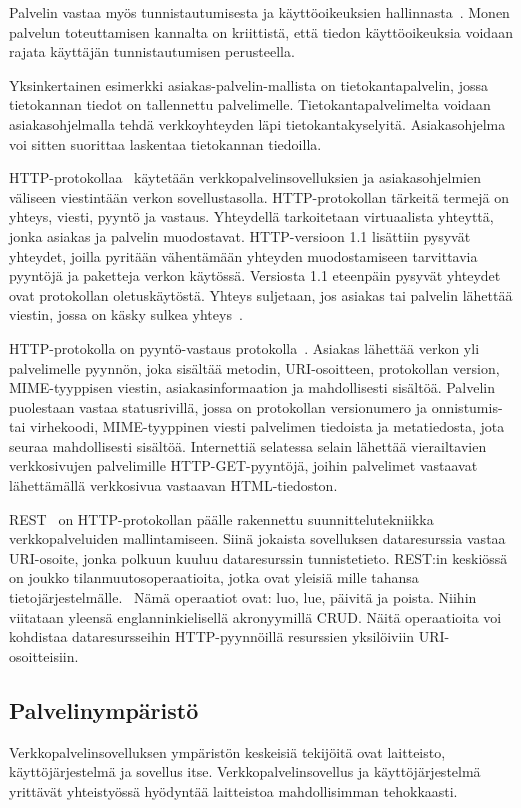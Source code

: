 \documentclass[finnish]{tktltiki2}%
\theoremstyle{definition}
\theoremstyle{remark}
\begin{document}
Palvelin vastaa myös tunnistautumisesta ja käyttöoikeuksien hallinnasta~\cite{pai_flash_1999}.
Monen palvelun toteuttamisen kannalta on kriittistä, että
tiedon käyttöoikeuksia voidaan rajata käyttäjän tunnistautumisen perusteella.

Yksinkertainen esimerkki asiakas-palvelin-mallista on tietokantapalvelin,
jossa tietokannan tiedot on tallennettu palvelimelle. Tietokantapalvelimelta
voidaan asiakasohjelmalla tehdä verkkoyhteyden läpi tietokantakyselyitä. Asiakasohjelma
voi sitten suorittaa laskentaa tietokannan tiedoilla.

HTTP-protokollaa~\cite{leach_hypertext} käytetään verkkopalvelinsovelluksien ja
asiakasohjelmien väliseen viestintään verkon sovellustasolla.
HTTP-protokollan tärkeitä termejä on yhteys, viesti, pyyntö ja vastaus.
Yhteydellä tarkoitetaan virtuaalista yhteyttä, jonka asiakas ja palvelin muodostavat.
HTTP-versioon 1.1 lisättiin pysyvät yhteydet, joilla pyritään
vähentämään yhteyden muodostamiseen tarvittavia pyyntöjä ja paketteja verkon
käytössä. Versiosta 1.1 eteenpäin pysyvät yhteydet ovat protokollan
oletuskäytöstä. Yhteys suljetaan, jos asiakas tai palvelin lähettää
viestin, jossa on käsky sulkea yhteys~\cite{leach_hypertext}.

HTTP-protokolla on pyyntö-vastaus protokolla~\cite{leach_hypertext}. Asiakas lähettää
verkon yli palvelimelle pyynnön, joka sisältää metodin, URI-osoitteen, protokollan
version, MIME-tyyppisen viestin, asiakasinformaation ja mahdollisesti
sisältöä. Palvelin puolestaan vastaa statusrivillä, jossa on protokollan
versionumero ja onnistumis-tai virhekoodi, MIME-tyyppinen viesti palvelimen
tiedoista ja metatiedosta, jota seuraa mahdollisesti sisältöä.
Internettiä selatessa selain lähettää vierailtavien verkkosivujen
palvelimille HTTP-GET-pyyntöjä, joihin palvelimet vastaavat
lähettämällä verkkosivua vastaavan HTML-tiedoston.

REST~\cite{battle_bridging_2008} on HTTP-protokollan
päälle rakennettu suunnittelutekniikka verkkopalveluiden mallintamiseen.
Siinä jokaista sovelluksen dataresurssia vastaa URI-osoite,
jonka polkuun kuuluu dataresurssin tunnistetieto.
REST:in keskiössä on joukko tilanmuutos\-operaatioita,
jotka ovat yleisiä mille tahansa tietojärjestelmälle. 
Nämä operaatiot ovat: luo, lue, päivitä ja poista.
Niihin viitataan yleensä englanninkielisellä
akronyymillä CRUD.
Näitä operaatioita voi kohdistaa dataresursseihin
HTTP-pyynnöillä resurssien yksilöiviin URI-osoitteisiin.

\subsection{Palvelinympäristö}
Verkkopalvelinsovelluksen ympäristön keskeisiä
tekijöitä ovat laitteisto, käyttöjärjestelmä ja sovellus itse.
Verkkopalvelinsovellus ja käyttöjärjestelmä
yrittävät yhteistyössä hyödyntää laitteistoa
mahdollisimman tehokkaasti.
\end{document}
